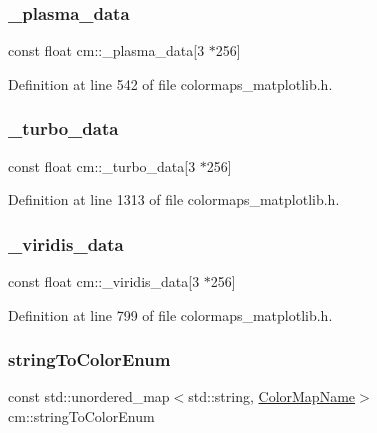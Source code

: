 \mbox{\label{namespacecm_a5e6bdf45c99146f14941db900036b42c}} 
\subsubsection{\texorpdfstring{\+\_\+plasma\+\_\+data}{\_plasma\_data}}
{\footnotesize\ttfamily const float cm\+::\+\_\+plasma\+\_\+data\mbox{[}3 $\ast$256\mbox{]}}



Definition at line 542 of file colormaps\+\_\+matplotlib.\+h.

\mbox{\label{namespacecm_a1394411b557deb7b6f8c58a9c39ff4a3}} 
\subsubsection{\texorpdfstring{\+\_\+turbo\+\_\+data}{\_turbo\_data}}
{\footnotesize\ttfamily const float cm\+::\+\_\+turbo\+\_\+data\mbox{[}3 $\ast$256\mbox{]}}



Definition at line 1313 of file colormaps\+\_\+matplotlib.\+h.

\mbox{\label{namespacecm_af931122787ac6cf5d5c8d834adcb3fc8}} 
\subsubsection{\texorpdfstring{\+\_\+viridis\+\_\+data}{\_viridis\_data}}
{\footnotesize\ttfamily const float cm\+::\+\_\+viridis\+\_\+data\mbox{[}3 $\ast$256\mbox{]}}



Definition at line 799 of file colormaps\+\_\+matplotlib.\+h.

\mbox{\label{namespacecm_a62bba085a1fd823321f70d53df62ed53}} 
\subsubsection{\texorpdfstring{string\+To\+Color\+Enum}{stringToColorEnum}}
{\footnotesize\ttfamily const std\+::unordered\+\_\+map$<$std\+::string, \hyperlink{namespacecm_aabaf84796e8a93bd6adca4c5bdea5311}{Color\+Map\+Name}$>$ cm\+::string\+To\+Color\+Enum}


